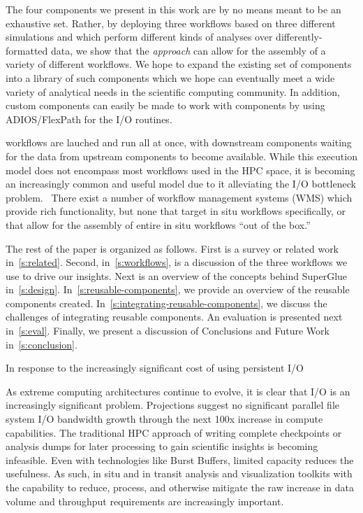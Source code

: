 The four components we present in this work
are by no means meant to be an exhaustive set.
Rather, by deploying three workflows
based on three different simulations
and which perform different kinds of
analyses over differently-formatted data,
we show that the \sys \textit{approach}
can allow for the assembly
of a variety of different workflows.
We hope to expand the existing set of
components into a library of such components
which we hope can eventually meet
a wide variety of analytical needs in the
scientific computing community.
In addition, custom components
can easily be made to work with
\sys components by using ADIOS/FlexPath
for the I/O routines.

\sys workflows are lauched and run all at once,
with downstream components waiting for
the data from upstream components to become
available.
While this execution model does not encompass
most workflows used in the HPC space, it
is becoming an increasingly common and useful model
due to it alleviating the I/O bottleneck problem.~\cite{ayachit2016performance}
There exist a number of workflow management systems (WMS)
which provide rich functionality, but none
that target in situ workflows specifically,
or that allow for the assembly of entire
in situ workflows ``out of the box.''

The rest of the paper is organized as follows. First is a survey or related
work in~\autoref{s:related}. Second, in~\autoref{s:workflows}, is a
discussion of the three workflows we use to drive our insights. Next is an
overview of the concepts behind SuperGlue in~\autoref{s:design}.
In~\autoref{s:reusable-components}, we provide an overview of the reusable
components created. In~\autoref{s:integrating-reusable-components}, we
discuss the challenges of integrating reusable components.  An evaluation is
presented next in~\autoref{s:eval}. Finally, we present a discussion of Conclusions
and Future Work in~\autoref{s:conclusion}.


In response to the increasingly significant cost of using
persistent I/O 

As extreme computing architectures continue to evolve, it is 
clear that I/O is an increasingly significant problem.  Projections suggest no
significant parallel file system I/O bandwidth growth through the next 100x
increase in compute capabilities.  The traditional HPC approach of writing
complete checkpoints or analysis dumps for later processing to gain scientific
insights is becoming infeasible.  Even with technologies like Burst Buffers,
limited capacity reduces the usefulness. As such, in situ and in transit
analysis and visualization toolkits with the capability to reduce, process, and
otherwise mitigate the raw increase in data volume and throughput requirements
are increasingly important.

